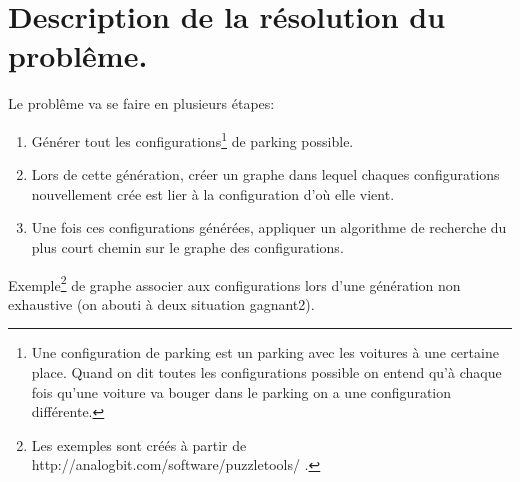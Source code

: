 \documentclass[10pt, a4paper]{article}
\begin{document}
\section{Description de la résolution du problême.}
    Le problême va se faire en plusieurs étapes:
    \begin{enumerate}
        \item Générer tout les configurations\footnote{Une configuration de
            parking est un parking avec les voitures à une certaine place.
            Quand on dit toutes les configurations possible on entend
            qu'à chaque fois qu'une voiture va bouger dans le parking on a une
            configuration différente.} de parking possible.
        \item Lors de cette génération, créer un graphe dans lequel chaques
            configurations nouvellement crée est lier à la configuration
            d'où elle vient.
        \item Une fois ces configurations générées, appliquer un algorithme de
            recherche du plus court chemin sur le graphe des configurations.
    \end{enumerate}

    Exemple\footnote{Les exemples sont créés à partir de
    http://analogbit.com/software/puzzletools/ .} de graphe associer aux
    configurations lors d'une génération non exhaustive (on abouti à deux
    situation gagnant2).\newline
\end{document}

